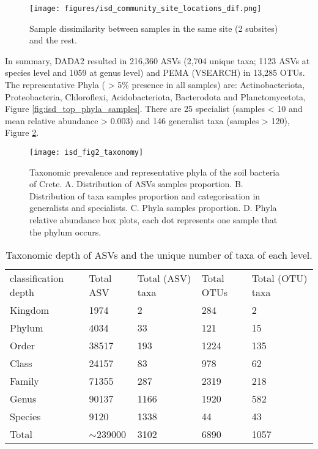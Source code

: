 \begin{figure}[hbt!] 
    \centering\texttt{[image: figures/isd\_community\_site\_locations\_dif.png]}
\caption{Sample dissimilarity between samples in the same site (2 subsites) and the rest.}
    \label{fig:isd_site_locations}
\end{figure}

In summary, DADA2 resulted in 216,360 ASVs (2,704 unique
taxa; 1123 ASVs at species level and 1059 at genus level) and
PEMA (VSEARCH) in 13,285 OTUs.
The representative Phyla ( > 5\% presence in all samples) are:
Actinobacteriota, Proteobacteria, Chloroflexi, Acidobacteriota,
Bacterodota and Planctomycetota, Figure \ref{fig:isd_top_phyla_samples}.
There are 25 specialist (samples < 10 and mean relative
abundance > 0.003) and 146 generalist taxa (samples > 120), Figure \ref{fig:isd_fig2_taxonomy}.

\begin{figure}[hbt!] 
    \centering\texttt{[image: isd\_fig2\_taxonomy]}
    \caption{Taxonomic prevalence and representative phyla of the soil bacteria of Crete. 
    A. Distribution of ASVs samples proportion. B. Distribution of taxa samples
proportion and categorisation in generalists and specialists. C. Phyla samples proportion.
D. Phyla relative abundance box plots, each dot represents one sample that the phylum occurs.}
    \label{fig:isd_fig2_taxonomy}
\end{figure}

\begin{table}[]
    \caption{Taxonomic depth of ASVs and the unique number of taxa of each level.}%
\begin{tabular}{@{}lllll@{}}
classification depth & Total ASV    & Total (ASV) taxa & Total OTUs & Total (OTU) taxa\\
Kingdom              & 1974         & 2                & 284        & 2               \\
Phylum               & 4034         & 33               & 121        & 15              \\
Order                & 38517        & 193              & 1224       & 135             \\
Class                & 24157        & 83               & 978        & 62              \\
Family               & 71355        & 287              & 2319       & 218             \\
Genus                & 90137        & 1166             & 1920       & 582             \\
Species              & 9120         & 1338             & 44         & 43              \\
Total                & $\sim$239000 & 3102             & 6890       & 1057            
\end{tabular}
\label{table:asv_taxonomy}
\end{table}

